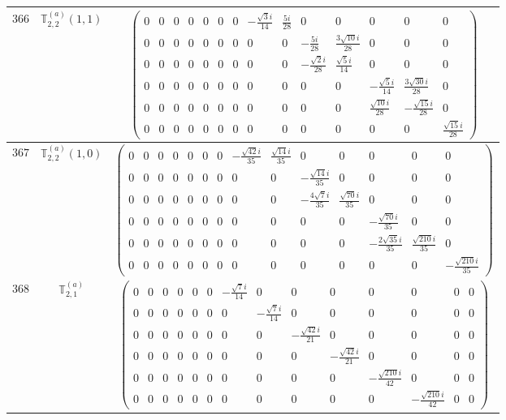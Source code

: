\documentclass[fleqn,8pt,landscape]{jsarticle}
\begin{document}
\begin{center}
\begin{longtable}{ccc}
$ 366 $ & $ \mathbb{T}_{2,2}^{(a)}(1,1) $ & $ \begin{pmatrix} 0 & 0 & 0 & 0 & 0 & 0 & 0 & - \frac{\sqrt{3} i}{14} & \frac{5 i}{28} & 0 & 0 & 0 & 0 & 0 \\ 0 & 0 & 0 & 0 & 0 & 0 & 0 & 0 & 0 & - \frac{5 i}{28} & \frac{3 \sqrt{10} i}{28} & 0 & 0 & 0 \\ 0 & 0 & 0 & 0 & 0 & 0 & 0 & 0 & 0 & - \frac{\sqrt{2} i}{28} & \frac{\sqrt{5} i}{14} & 0 & 0 & 0 \\ 0 & 0 & 0 & 0 & 0 & 0 & 0 & 0 & 0 & 0 & 0 & - \frac{\sqrt{5} i}{14} & \frac{3 \sqrt{30} i}{28} & 0 \\ 0 & 0 & 0 & 0 & 0 & 0 & 0 & 0 & 0 & 0 & 0 & \frac{\sqrt{10} i}{28} & - \frac{\sqrt{15} i}{28} & 0 \\ 0 & 0 & 0 & 0 & 0 & 0 & 0 & 0 & 0 & 0 & 0 & 0 & 0 & \frac{\sqrt{15} i}{28} \end{pmatrix} $ \\ \hline
$ 367 $ & $ \mathbb{T}_{2,2}^{(a)}(1,0) $ & $ \begin{pmatrix} 0 & 0 & 0 & 0 & 0 & 0 & 0 & - \frac{\sqrt{42} i}{35} & \frac{\sqrt{14} i}{35} & 0 & 0 & 0 & 0 & 0 \\ 0 & 0 & 0 & 0 & 0 & 0 & 0 & 0 & 0 & - \frac{\sqrt{14} i}{35} & 0 & 0 & 0 & 0 \\ 0 & 0 & 0 & 0 & 0 & 0 & 0 & 0 & 0 & - \frac{4 \sqrt{7} i}{35} & \frac{\sqrt{70} i}{35} & 0 & 0 & 0 \\ 0 & 0 & 0 & 0 & 0 & 0 & 0 & 0 & 0 & 0 & 0 & - \frac{\sqrt{70} i}{35} & 0 & 0 \\ 0 & 0 & 0 & 0 & 0 & 0 & 0 & 0 & 0 & 0 & 0 & - \frac{2 \sqrt{35} i}{35} & \frac{\sqrt{210} i}{35} & 0 \\ 0 & 0 & 0 & 0 & 0 & 0 & 0 & 0 & 0 & 0 & 0 & 0 & 0 & - \frac{\sqrt{210} i}{35} \end{pmatrix} $ \\ \hline
$ 368 $ & $ \mathbb{T}_{2,1}^{(a)} $ & $ \begin{pmatrix} 0 & 0 & 0 & 0 & 0 & 0 & - \frac{\sqrt{7} i}{14} & 0 & 0 & 0 & 0 & 0 & 0 & 0 \\ 0 & 0 & 0 & 0 & 0 & 0 & 0 & - \frac{\sqrt{7} i}{14} & 0 & 0 & 0 & 0 & 0 & 0 \\ 0 & 0 & 0 & 0 & 0 & 0 & 0 & 0 & - \frac{\sqrt{42} i}{21} & 0 & 0 & 0 & 0 & 0 \\ 0 & 0 & 0 & 0 & 0 & 0 & 0 & 0 & 0 & - \frac{\sqrt{42} i}{21} & 0 & 0 & 0 & 0 \\ 0 & 0 & 0 & 0 & 0 & 0 & 0 & 0 & 0 & 0 & - \frac{\sqrt{210} i}{42} & 0 & 0 & 0 \\ 0 & 0 & 0 & 0 & 0 & 0 & 0 & 0 & 0 & 0 & 0 & - \frac{\sqrt{210} i}{42} & 0 & 0 \end{pmatrix} $ \\ \hline

\end{longtable}
\end{center}
\end{document}
